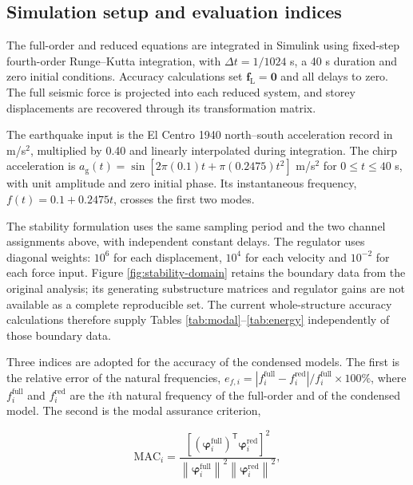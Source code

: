\documentclass[a4paper,fleqn,review,12pt]{cas-sc}
\numberwithin{equation}{section}
\newcommand{\rev}[1]{{\color{red}#1}}
\begin{document}
\subsection{Simulation setup and evaluation indices}
\label{sec:setup}

\rev{The full-order and reduced equations are integrated in Simulink using fixed-step fourth-order Runge--Kutta integration, with \(\Delta t=1/1024\) s, a 40 s duration and zero initial conditions. Accuracy calculations set \(\bm f_{\mathrm L}=\bm0\) and all delays to zero. The full seismic force is projected into each reduced system, and storey displacements are recovered through its transformation matrix.}

\rev{The earthquake input is the El Centro 1940 north--south acceleration record in m/s\(^{2}\), multiplied by 0.40 and linearly interpolated during integration. The chirp acceleration is \(a_{\mathrm g}(t)=\sin[2\pi(0.1)t+\pi(0.2475)t^2]\) m/s\(^{2}\) for \(0\leq t\leq40\) s, with unit amplitude and zero initial phase. Its instantaneous frequency, \(f(t)=0.1+0.2475t\), crosses the first two modes.}

\rev{The stability formulation uses the same sampling period and the two channel assignments above, with independent constant delays. The regulator uses diagonal weights: \(10^6\) for each displacement, \(10^4\) for each velocity and \(10^{-2}\) for each force input. Figure \ref{fig:stability-domain} retains the boundary data from the original analysis; its generating substructure matrices and regulator gains are not available as a complete reproducible set. The current whole-structure accuracy calculations therefore supply Tables \ref{tab:modal}--\ref{tab:energy} independently of those boundary data.}

Three indices are adopted for the accuracy of the condensed models. The first is the relative error of the natural frequencies, \(e_{f,i}=|f_{i}^{\mathrm{full}}-f_{i}^{\mathrm{red}}|/f_{i}^{\mathrm{full}}\times100\%\), where \(f_{i}^{\mathrm{full}}\) and \(f_{i}^{\mathrm{red}}\) are the \(i\)th natural frequency of the full-order and of the condensed model. The second is the modal assurance criterion,

\begin{equation}
	\mathrm{MAC}_{i}=
	\frac{\left[\left(\bm{\varphi}_{i}^{\mathrm{full}}\right)^{\mathsf{T}}
		\bm{\varphi}_{i}^{\mathrm{red}}\right]^{2}}
	{\left\|\bm{\varphi}_{i}^{\mathrm{full}}\right\|^{2}
		\left\|\bm{\varphi}_{i}^{\mathrm{red}}\right\|^{2}},
	\label{eq:mac}
\end{equation}
\end{document}
